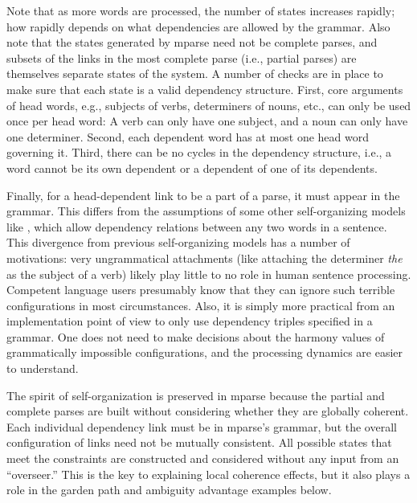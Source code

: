 \documentclass[a4paper, 12pt]{article}
\begin{document}
Note that as more words are processed, the number of states increases rapidly;
how rapidly depends on what dependencies are allowed by the grammar. Also note
that the states generated by mparse need not be complete parses, and subsets of
the links in the most complete parse (i.e., partial parses) are themselves
separate states of the system.%
A number of checks are in place to make
sure that each state is a valid dependency structure. First, core arguments of
head words, e.g., subjects of verbs, determiners of nouns, etc., can only be
used once per head word: A verb can only have one subject, and a noun can only
have one determiner.  Second, each dependent word has at most one head word
governing it. Third, there can be no cycles in the dependency structure, i.e.,
a word cannot be its own dependent or a dependent of one of its dependents.

Finally, for a head-dependent link to be a part of a parse, it must
appear in the grammar. This differs from the assumptions of some other
self-organizing models like \citet{smith2018toward, smith2018self,
    smith2021encoding}, which allow dependency relations between any two words
in a sentence. This divergence from previous self-organizing models has a
number of motivations: very ungrammatical attachments (like attaching the
determiner \emph{the} as the subject of a verb) likely play little to no role
in human sentence processing. Competent language users presumably know that
they can ignore such terrible configurations in most circumstances. Also, it is
simply more practical from an implementation point of view to only use
dependency triples specified in a grammar. One does not need to make decisions about
the harmony values of grammatically impossible configurations, and the
processing dynamics are easier to understand.

The spirit of self-organization is preserved in mparse because the
partial and complete parses are built without considering whether they are
globally coherent. Each individual dependency link must be in mparse's grammar,
but the overall configuration of links need not be mutually consistent. All
possible states that meet the constraints are constructed and considered
without any input from an ``overseer.'' This is the key to explaining local
coherence effects, but it also plays a role in the garden path and ambiguity
advantage examples below.
\end{document}
